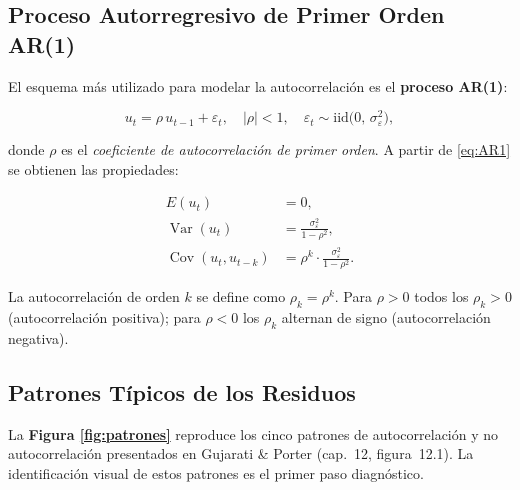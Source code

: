 \documentclass[12pt,a4paper]{article}
\theoremstyle{definition}
\theoremstyle{remark}
\begin{document}
\subsection{Proceso Autorregresivo de Primer Orden AR(1)}

El esquema más utilizado para modelar la autocorrelación es el
\textbf{proceso AR(1)}:

\begin{equation}
  u_t = \rho\, u_{t-1} + \varepsilon_t, \quad
  |\rho| < 1, \quad
  \varepsilon_t \sim \text{iid}\bigl(0,\,\sigma_\varepsilon^2\bigr),
  \label{eq:AR1}
\end{equation}

donde $\rho$ es el \emph{coeficiente de autocorrelación de primer orden}.
A partir de \eqref{eq:AR1} se obtienen las propiedades:

\begin{align}
  E(u_t)           &= 0, \label{eq:media-cero}\\
  \operatorname{Var}(u_t) &= \frac{\sigma_\varepsilon^2}{1-\rho^2},
                            \label{eq:varianza-u}\\
  \operatorname{Cov}(u_t, u_{t-k}) &= \rho^k \cdot
                            \frac{\sigma_\varepsilon^2}{1-\rho^2}.
                            \label{eq:cov-k}
\end{align}

\begin{nota}
  La autocorrelación de orden $k$ se define como
  $\rho_k = \rho^k$. Para $\rho > 0$ todos los $\rho_k > 0$
  (autocorrelación positiva); para $\rho < 0$ los $\rho_k$ alternan
  de signo (autocorrelación negativa).
\end{nota}

\subsection{Patrones Típicos de los Residuos}
\label{subsec:patrones}

La \textbf{Figura \ref{fig:patrones}} reproduce los cinco patrones de
autocorrelación y no autocorrelación presentados en Gujarati \& Porter
(cap.~12, figura~12.1). La identificación visual de estos patrones es
el primer paso diagnóstico.
\end{document}
